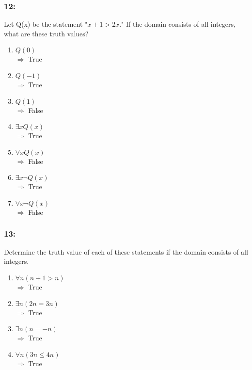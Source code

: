 \documentclass[12pt,en,a4paper]{report}
\begin{document}
	\subsubsection*{12:}
	Let Q(x) be the statement "$x+1>2x$." If the domain consists of all integers, what are these truth values?
	\begin{enumerate}[label=\textbf{\alph*)}]
		\item $Q(0)$\\
		$\Rightarrow$ True
		\item $Q(-1)$\\
		$\Rightarrow$ True
		\item $Q(1)$\\
		$\Rightarrow$ False
		\item $\exists x Q(x)$\\
		$\Rightarrow$ True
		\item $\forall x Q(x)$\\
		$\Rightarrow$ False
		\item $\exists x \neg Q(x)$\\
		$\Rightarrow$ True
		\item $\forall x \neg Q(x)$\\
		$\Rightarrow$ False
	\end{enumerate}
	\subsubsection*{13:}
	Determine the truth value of each of these statements if the domain consists of all integers.
	\begin{enumerate}[label=\textbf{\alph*)}]
		\item $\forall n(n+1>n)$\\
		$\Rightarrow$ True
		\item $\exists n (2n=3n)$\\
		$\Rightarrow$ True
		\item $\exists n (n=-n)$\\
		$\Rightarrow$ True
		\item $\forall n (3n \leq 4n)$\\
		$\Rightarrow$ True
	\end{enumerate}
\end{document}

